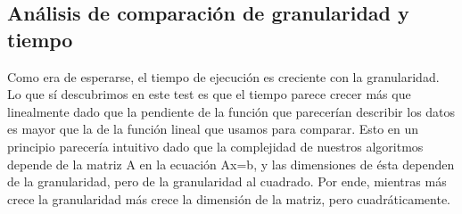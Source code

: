 \subsection{Análisis de comparación de granularidad y tiempo}

Como era de esperarse, el tiempo de ejecución es creciente con la granularidad. Lo que sí
descubrimos en este test es que el tiempo parece crecer más que linealmente dado que la pendiente
de la función que parecerían describir los datos es mayor que la de la función lineal que usamos
para comparar. Esto en un principio parecería intuitivo dado que la complejidad de nuestros
algoritmos depende de la matriz A en la ecuación Ax=b, y las dimensiones de ésta dependen de la
granularidad, pero de la granularidad al cuadrado. Por ende, mientras más crece la granularidad más
crece la dimensión de la matriz, pero cuadráticamente.
